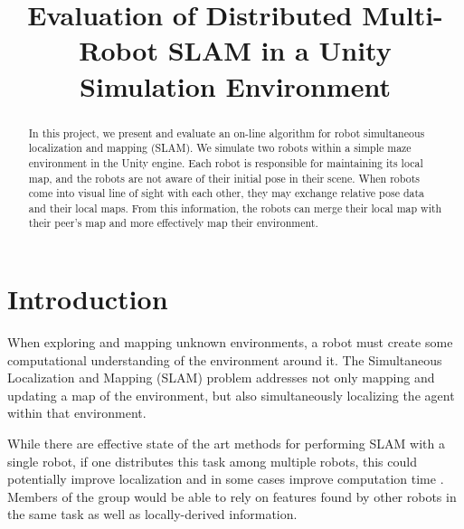 \documentclass[11pt, conference]{IEEEtran}
\begin{document}
\title{Evaluation of Distributed Multi-Robot SLAM in a Unity Simulation Environment\\
}

\author{
\and
{}
}

\maketitle

\begin{abstract}
In this project, we present and evaluate an on-line algorithm for robot simultaneous localization and mapping (SLAM). We simulate two robots within a simple maze environment in the Unity engine. Each robot is responsible for maintaining its local map, and the robots are not aware of their initial pose in their scene. When robots come into visual line of sight with each other, they may exchange relative pose data and their local maps. From this information, the robots can merge their local map with their peer's map and more effectively map their environment.
\end{abstract}


\section{Introduction}
When exploring and mapping unknown environments, a robot must create some computational understanding of the environment around it. The Simultaneous Localization and Mapping (SLAM) problem addresses not only mapping and updating a map of the environment, but also simultaneously localizing the agent within that environment.

While there are effective state of the art methods for performing SLAM with a single robot, if one distributes this task among multiple robots, this could potentially improve localization \cite{1067998} and in some cases improve computation time \cite{Bonin}. Members of the group would be able to rely on features found by other robots in the same task as well as locally-derived information.
\end{document}
